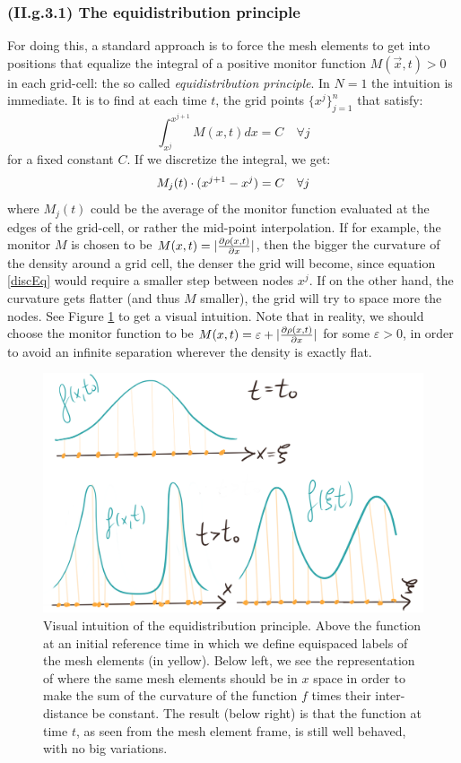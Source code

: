 \documentclass[11pt, a4paper]{article} %
\begin{document}
\subsubsection*{(II.g.3.1) The equidistribution principle \vspace{-0.2cm}}
For doing this, a standard approach is to force the mesh elements to get into positions that equalize the integral of a positive monitor function $M(\vec{x},t)>0$ in each grid-cell: the so called {\em equidistribution principle}. In $N=1$ the intuition is immediate. It is to find at each time $t$, the grid points $\{x^j\}_{j=1}^n$ that satisfy:\vspace{-0.1cm}
\begin{equation}
\int^{x^{j+1}}_{x^j} M(x,t) dx =C \quad \forall j
\end{equation}
for a fixed constant $C$. If we discretize the integral, we get:
\begin{equation}\label{discEq}
M_j(t)\cdot (x^{j+1}-x^j)=C \quad \forall j \vspace{-0.1cm}
\end{equation}
where $M_j(t)$ could be the average of the monitor function evaluated at the edges of the grid-cell, or rather the mid-point interpolation. If for example, the monitor $M$ is chosen to be $M(x,t)=|\pdv{\rho(x,t)}{x}|$, then the bigger the curvature of the density around a grid cell, the denser the grid will become, since equation \eqref{discEq} would require a smaller step between nodes $x^j$. If on the other hand, the curvature gets flatter (and thus $M$ smaller), the grid will try to space more the nodes. See Figure \ref{fig:equid} to get a visual intuition. Note that in reality, we should choose the monitor function to be $M(x,t)=\varepsilon+|\pdv{\rho(x,t)}{x}|$ for some $\varepsilon>0$, in order to avoid an infinite separation wherever the density is exactly flat.\vspace{0.1cm}
\begin{figure}[h!]
  \centering
    \includegraphics[width=0.50\linewidth]{8equidistribution.png}
  \caption{ Visual intuition of the equidistribution principle. Above the function at an initial reference time in which we define equispaced labels of the mesh elements (in yellow). Below left, we see the representation of where the same mesh elements should be in $x$ space in order to make the sum of the curvature of the function $f$ times their inter-distance be constant. The result (below right) is that the function at time $t$, as seen from the mesh element frame, is still well behaved, with no big variations. }
  \label{fig:equid}
\end{figure}
\end{document}
